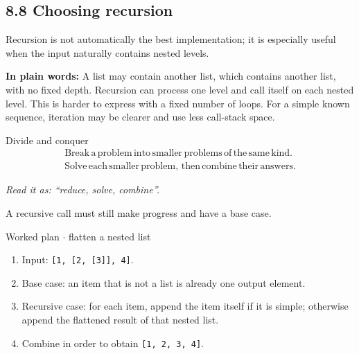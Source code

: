 \documentclass[11pt]{article}
\begin{document}
\begin{keepsection}
\section{8.8 Choosing recursion}

Recursion is not automatically the best implementation; it is especially useful when the input naturally contains nested levels.

\begin{plainbox}\textbf{In plain words:} A list may contain another list, which contains another list, with no fixed depth. Recursion can process one level and call itself on each nested level. This is harder to express with a fixed number of loops. For a simple known sequence, iteration may be clearer and use less call-stack space.\end{plainbox}

\begin{equationcard}{Divide and conquer}
\[ \begin{gathered} \text{Break}\, \mathrm{a}\, \text{problem}\, \text{into}\, \text{smaller}\, \text{problems}\, \text{of}\, \text{the}\, \text{same}\, \text{kind}. \\ \text{Solve}\, \text{each}\, \text{smaller}\, \text{problem},\, \text{then}\, \text{combine}\, \text{their}\, \text{answers}. \end{gathered} \]
{\small \emph{Read it as: “reduce, solve, combine”.}\par  A recursive call must still make progress and have a base case.}
\end{equationcard}

\begin{workedbox}{Worked plan \ensuremath{\cdot} flatten a nested list}
\begin{enumerate}
\item Input: \texttt{[1, [2, [3]], 4]}.
\item Base case: an item that is not a list is already one output element.
\item Recursive case: for each item, append the item itself if it is simple; otherwise append the flattened result of that nested list.
\item Combine in order to obtain \texttt{[1, 2, 3, 4]}.
\end{enumerate}
\end{workedbox}


\end{keepsection}
\end{document}
